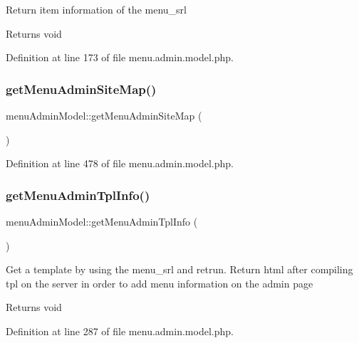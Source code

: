 Return item information of the menu\+\_\+srl \begin{DoxyReturn}{Returns}
void 
\end{DoxyReturn}


Definition at line 173 of file menu.\+admin.\+model.\+php.

\hypertarget{classmenuAdminModel_adaae66f6de001bdaa33b72bcc83a6747}{}\label{classmenuAdminModel_adaae66f6de001bdaa33b72bcc83a6747} 
\subsubsection{\texorpdfstring{get\+Menu\+Admin\+Site\+Map()}{getMenuAdminSiteMap()}}
{\footnotesize\ttfamily menu\+Admin\+Model\+::get\+Menu\+Admin\+Site\+Map (\begin{DoxyParamCaption}{ }\end{DoxyParamCaption})}



Definition at line 478 of file menu.\+admin.\+model.\+php.

\hypertarget{classmenuAdminModel_a9f938b72f1488559cab19e9011ae7076}{}\label{classmenuAdminModel_a9f938b72f1488559cab19e9011ae7076} 
\subsubsection{\texorpdfstring{get\+Menu\+Admin\+Tpl\+Info()}{getMenuAdminTplInfo()}}
{\footnotesize\ttfamily menu\+Admin\+Model\+::get\+Menu\+Admin\+Tpl\+Info (\begin{DoxyParamCaption}{ }\end{DoxyParamCaption})}

Get a template by using the menu\+\_\+srl and retrun. Return html after compiling tpl on the server in order to add menu information on the admin page \begin{DoxyReturn}{Returns}
void 
\end{DoxyReturn}


Definition at line 287 of file menu.\+admin.\+model.\+php.

\hypertarget{classmenuAdminModel_a358509545ff88093b02be04c6599796d}{}\label{classmenuAdminModel_a358509545ff88093b02be04c6599796d} 
